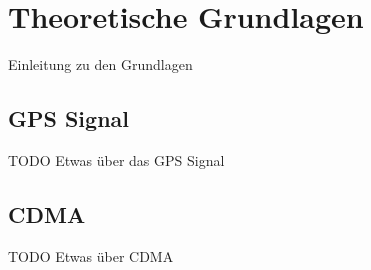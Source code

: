 \chapter{Theoretische Grundlagen}
Einleitung zu den Grundlagen

\section{GPS Signal}
TODO Etwas über das GPS Signal

\section{CDMA}
TODO Etwas über CDMA


